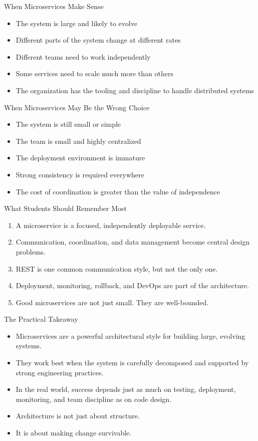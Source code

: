 \begin{frame}{When Microservices Make Sense}
\begin{itemize}
    \item The system is large and likely to evolve
    \item Different parts of the system change at different rates
    \item Different teams need to work independently
    \item Some services need to scale much more than others
    \item The organization has the tooling and discipline to handle distributed systems
\end{itemize}
\end{frame}

\begin{frame}{When Microservices May Be the Wrong Choice}
\begin{itemize}
    \item The system is still small or simple
    \item The team is small and highly centralized
    \item The deployment environment is immature
    \item Strong consistency is required everywhere
    \item The cost of coordination is greater than the value of independence
\end{itemize}
\end{frame}

\begin{frame}{What Students Should Remember Most}
\begin{enumerate}
    \item A microservice is a focused, independently deployable service.
    \item Communication, coordination, and data management become central design problems.
    \item REST is one common communication style, but not the only one.
    \item Deployment, monitoring, rollback, and DevOps are part of the architecture.
    \item Good microservices are not just small. They are well-bounded.
\end{enumerate}
\end{frame}

\begin{frame}{The Practical Takeaway}
\begin{itemize}
    \item Microservices are a powerful architectural style for building large, evolving systems.
    \item They work best when the system is carefully decomposed and supported by strong engineering practices.
    \item In the real world, success depends just as much on testing, deployment, monitoring, and team discipline as on code design.
    \item Architecture is not just about structure.
    \item It is about making change survivable.
\end{itemize}
\end{frame}

